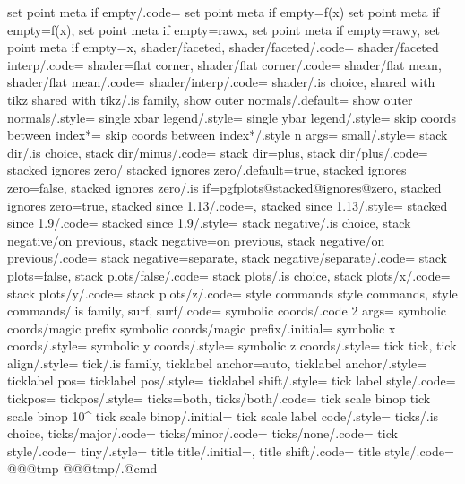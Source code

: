 {{{{{{{{{{{{{{{{{{{{{{{{{{{{{{{{{{{{{{{{{{{{{{{{{{{{{{{{{{{{{{{{{{{{{{{{{{{{{{{{{{{{{{{{{{{{{{{{{{{{{{{{{{{{{{{{{{{{{{{{{{{{{{{{{{{{{{{{{{{{{{{{{{{{{{{{{{{{{{{{{{{{{{{{{{{{{{{{{{{{{{{{{{{{{{{{{{{{{{{{{{{{{{{{{{{{{{{{{{{{{{{{{{{{{{{{{{{{{{{{{{{{{{{{{{{{{{{{{{{{{{{{{{{{{{{{{{{{{{{{{{{{{{{{{{{{{{{{{{{{{{{{{{{{{{{{{{{{{{{{{{{{{{{{{{{{{{{{{{{{{{{{{{{{{{{{{{{{{{{{{{{{{{{{{{{{{{{{{{{{{{{{{{{{{{{{{{{{{{{{{{{{{{{{{{{{{{{{{{{{{{{{{{{{{{{{{{{{{{{{{{{{{{{{{{{{{{{{{{{{{{{{{{{{{{{{{{{{{{{{{{{{{{{{{{{{{{{{{{{{{{{{{{{{{{{{{{{{{{{{{{{{{{{{{{{{{{{{{{{{{{{{{{{{{{{{{{{{{{{{{{{{{{{{{{{{{{{{{{{{{{{{{{{{{{{{{{{{{{{{{{{{{{{{{{{{{{{{{{set point meta if empty/.code={
set point meta if empty=f(x)
set point meta if empty=f(x),
set point meta if empty=rawx,
set point meta if empty=rawy,
set point meta if empty=x,
shader/faceted,
shader/faceted/.code={
shader/faceted interp/.code={
shader=flat corner,
shader/flat corner/.code={
shader/flat mean,
shader/flat mean/.code={
shader/interp/.code={
shader/.is choice,
shared with tikz
shared with tikz/.is family,
show outer normals/.default={
show outer normals/.style={
single xbar legend/.style={
single ybar legend/.style={
skip coords between index*={
skip coords between index*/.style n args={
small/.style={
stack dir/.is choice,
stack dir/minus/.code={
stack dir=plus,
stack dir/plus/.code={
stacked ignores zero/
stacked ignores zero/.default=true,
stacked ignores zero=false,
stacked ignores zero/.is if=pgfplots@stacked@ignores@zero,
stacked ignores zero=true,
stacked since 1.13/.code=,
stacked since 1.13/.style={
stacked since 1.9/.code={
stacked since 1.9/.style={
stack negative/.is choice,
stack negative/on previous,
stack negative=on previous,
stack negative/on previous/.code={
stack negative=separate,
stack negative/separate/.code={
stack plots=false,
stack plots/false/.code={
stack plots/.is choice,
stack plots/x/.code={
stack plots/y/.code={
stack plots/z/.code={
style commands
style commands,
style commands/.is family,
surf,
surf/.code={
symbolic coords/.code 2 args={
symbolic coords/magic prefix
symbolic coords/magic prefix/.initial={
symbolic x coords/.style={
symbolic y coords/.style={
symbolic z coords/.style={
tick
tick,
tick align/.style={
tick/.is family,
ticklabel anchor=auto,
ticklabel anchor/.style={
ticklabel pos={
ticklabel pos/.style={
ticklabel shift/.style={
tick label style/.code={
tickpos={
tickpos/.style={
ticks=both,
ticks/both/.code={
tick scale binop 
tick scale binop 10^{
tick scale binop/.initial=
tick scale label code/.style={
ticks/.is choice,
ticks/major/.code={
ticks/minor/.code={
ticks/none/.code={
tick style/.code={
tiny/.style={
title}
title/.initial=,
title shift/.code={
title style/.code={
@@@tmp{
@@@tmp/.@cmd
}}}}}}}}}}}}}}}}}}}}}}}}}}}}}}}}}}}}}}}}}}}}}}}}}}}}}}}}}}}}}}}}}}}}}}}}}}}}}}}}}}}}}}}}}}}}}}}}}}}}}}}}}}}}}}}}}}}}}}}}}}}}}}}}}}}}}}}}}}}}}}}}}}}}}}}}}}}}}}}}}}}}}}}}}}}}}}}}}}}}}}}}}}}}}}}}}}}}}}}}}}}}}}}}}}}}}}}}}}}}}}}}}}}}}}}}}}}}}}}}}}}}}}}}}}}}}}}}}}}}}}}}}}}}}}}}}}}}}}}}}}}}}}}}}}}}}}}}}}}}}}}}}}}}}}}}}}}}}}}}}}}}}}}}}}}}}}}}}}}}}}}}}}}}}}}}}}}}}}}}}}}}}}}}}}}}}}}}}}}}}}}}}}}}}}}}}}}}}}}}}}}}}}}}}}}}}}}}}}}}}}}}}}}}}}}}}}}}}}}}}}}}}}}}}}}}}}}}}}}}}}}}}}}}}}}}}}}}}}}}}}}}}}}}}}}}}}}}}}}}}}}}}}}}}}}}}}}}}}}}}}}}}}}}}}}}}}}}}}}}}}}}}}}}}}}}}}}}}}}}}}}}}}}}}}}}}}}}}}}}}}}}}}}}}}}}}}}}}}}}}}}}}}}}}}}}}}}}}}}}}}}}}}}}}}}}}}}}}}}}}}}}}}}}}}}}}}}}}}}}}}}}}}
